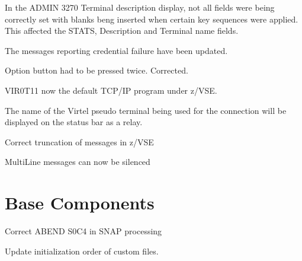 \documentclass[letterpaper,10pt,english]{sphinxmanual}
\begin{document}
\sphinxAtStartPar
{}

\sphinxAtStartPar
In the ADMIN 3270 Terminal description display, not all fields were being correctly set with blanks beng inserted when certain key sequences were applied. This affected the STATS, Description and Terminal name fields.

\sphinxAtStartPar
{}

\sphinxAtStartPar
The messages reporting credential failure have been updated.

\sphinxAtStartPar
{}

\sphinxAtStartPar
Option button had to be pressed twice. Corrected.

\sphinxAtStartPar
{}

\sphinxAtStartPar
VIR0T11 now the default TCP/IP program under z/VSE.

\sphinxAtStartPar
{}

\sphinxAtStartPar
The name of the Virtel pseudo terminal being used for the connection will be displayed on the status bar as a relay.

\sphinxAtStartPar
{}

\sphinxAtStartPar
Correct truncation of messages in z/VSE

\sphinxAtStartPar
{}

\sphinxAtStartPar
Multi\sphinxhyphen{}Line messages can now be silenced

\newpage


\section{Base Components}
\label{\detokenize{TN202403:base-components}}
\sphinxAtStartPar
{}

\sphinxAtStartPar
Correct ABEND S0C4 in SNAP processing

\sphinxAtStartPar
{}

\sphinxAtStartPar
Update initialization order of custom files.
\end{document}
